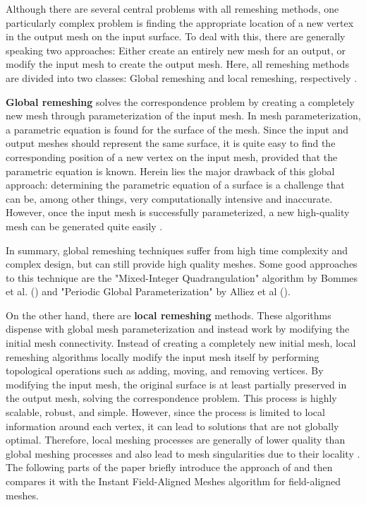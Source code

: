 \documentclass{ACGSeminar}
\begin{document}
Although there are several central problems with all remeshing methods, one particularly complex problem is finding the appropriate location of a new vertex in the output mesh on the input surface. To deal with this, there are generally speaking two approaches: Either create an entirely new mesh for an output, or modify the input mesh to create the output mesh. Here, all remeshing methods are divided into two classes: Global remeshing and local remeshing, respectively \cite{botsch2007geometric,alliez2008recent}.\bigskip

\textbf{Global remeshing} solves the correspondence problem by creating a completely new mesh through parameterization of the input mesh. In mesh parameterization, a parametric equation is found for the surface of the mesh. Since the input and output meshes should represent the same surface, it is quite easy to find the corresponding position of a new vertex on the input mesh, provided that the parametric equation is known. Herein lies the major drawback of this global approach: determining the parametric equation of a surface is a challenge that can be, among other things, very computationally intensive and inaccurate. However, once the input mesh is successfully parameterized, a new high-quality mesh can be generated quite easily \cite{jakob2015instant,alliez2008recent}.

In summary, global remeshing techniques suffer from high time complexity and complex design, but can still provide high quality meshes. Some good approaches to this technique are the "Mixed-Integer Quadrangulation" algorithm by Bommes et al. (\cite{bommes2009mixed}) and "Periodic Global Parameterization" by Alliez et al (\cite{ray2006periodic}).\bigskip

On the other hand, there are \textbf{local remeshing} methods. These algorithms dispense with global mesh parameterization and instead work by modifying the initial mesh connectivity. Instead of creating a completely new initial mesh, local remeshing algorithms locally modify the input mesh itself by performing topological operations such as adding, moving, and removing vertices. By modifying the input mesh, the original surface is at least partially preserved in the output mesh, solving the correspondence problem. This process is highly scalable, robust, and simple. However, since the process is limited to local information around each vertex, it can lead to solutions that are not globally optimal. Therefore, local meshing processes are generally of lower quality than global meshing processes and also lead to mesh singularities due to their locality \cite{jakob2015instant,alliez2008recent}. The following parts of the paper briefly introduce the approach of \cite{tarini2010practical} and then compares it with the Instant Field-Aligned Meshes algorithm for field-aligned meshes.
\end{document}
